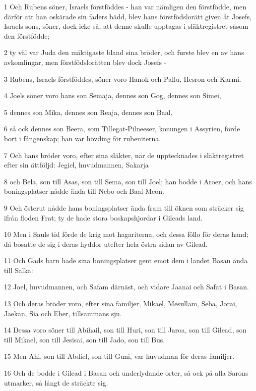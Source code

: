 \par 1 Och Rubens söner, Israels förstföddes - han var nämligen den förstfödde, men därför att han oskärade sin faders bädd, blev hans förstfödslorätt given åt Josefs, Israels sons, söner, dock icke så, att denne skulle upptagas i släktregistret såsom den förstfödde;
\par 2 ty väl var Juda den mäktigaste bland sina bröder, och furste blev en av hans avkomlingar, men förstfödslorätten blev dock Josefs -
\par 3 Rubens, Israels förstföddes, söner voro Hanok och Pallu, Hesron och Karmi.
\par 4 Joels söner voro hans son Semaja, dennes son Gog, dennes son Simei,
\par 5 dennes son Mika, dennes son Reaja, dennes son Baal,
\par 6 så ock dennes son Beera, som Tillegat-Pilneeser, konungen i Assyrien, förde bort i fångenskap; han var hövding för rubeniterna.
\par 7 Och hans bröder voro, efter sina släkter, när de upptecknades i släktregistret efter sin ättföljd: Jegiel, huvudmannen, Sakarja
\par 8 och Bela, son till Asas, son till Sema, son till Joel; han bodde i Aroer, och hans boningsplatser nådde ända till Nebo och Baal-Meon.
\par 9 Och österut nådde hans boningsplatser ända fram till öknen som sträcker sig ifrån floden Frat; ty de hade stora boskapshjordar i Gileads land.
\par 10 Men i Sauls tid förde de krig mot hagariterna, och dessa föllo för deras hand; då bosatte de sig i deras hyddor utefter hela östra sidan av Gilead.
\par 11 Och Gads barn hade sina boningsplatser gent emot dem i landet Basan ända till Salka:
\par 12 Joel, huvudmannen, och Safam därnäst, och vidare Jaanai och Safat i Basan.
\par 13 Och deras bröder voro, efter sina familjer, Mikael, Mesullam, Seba, Jorai, Jaekan, Sia och Eber, tillsammans sju.
\par 14 Dessa voro söner till Abihail, son till Huri, son till Jaroa, son till Gilead, son till Mikael, son till Jesisai, son till Jado, son till Bus.
\par 15 Men Ahi, son till Abdiel, son till Guni, var huvudman för deras familjer.
\par 16 Och de bodde i Gilead i Basan och underlydande orter, så ock på alla Sarons utmarker, så långt de sträckte sig.

